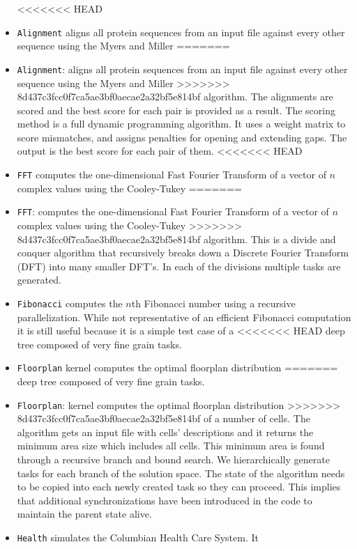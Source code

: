 \documentclass[sigconf]{acmart}
\begin{document}
\begin{itemize}
<<<<<<< HEAD
\item \texttt{Alignment} aligns all protein sequences from  an  input
file  against  every  other  sequence  using  the Myers and Miller 
=======
\item \texttt{Alignment}: aligns all protein sequences from  an  input
file  against  every  other  sequence  using  the Myers and Miller
>>>>>>> 8d437c3fcc0f7ca5ae3bf0aecae2a32bf5e814bf
algorithm. The alignments are scored and the best score for each pair is
provided as a result. The scoring method is  a  full  dynamic  programming
algorithm. It uses  a  weight matrix to score mismatches, and assigns
penalties for opening and extending gaps. The output is the best score for each
pair of them.
<<<<<<< HEAD
\item \texttt{FFT} computes the one-dimensional Fast Fourier Transform
of a vector of $n$ complex values using the Cooley-Tukey 
=======
\item \texttt{FFT}: computes the one-dimensional Fast Fourier Transform
of a vector of $n$ complex values using the Cooley-Tukey
>>>>>>> 8d437c3fcc0f7ca5ae3bf0aecae2a32bf5e814bf
algorithm. This is a divide and conquer algorithm that  recursively  breaks
down a Discrete Fourier Transform (DFT) into many smaller DFT’s. In each of the
divisions multiple tasks are generated.
\item \texttt{Fibonacci} computes the $n$th Fibonacci number using a  recursive
parallelization. While  not  representative  of  an efficient  Fibonacci
computation  it  is  still  useful  because  it  is a simple test case of a
<<<<<<< HEAD
deep tree composed of very fine grain tasks.  
\item \texttt{Floorplan} kernel computes the optimal floorplan distribution
=======
deep tree composed of very fine grain tasks.
\item \texttt{Floorplan}: kernel computes the optimal floorplan distribution
>>>>>>> 8d437c3fcc0f7ca5ae3bf0aecae2a32bf5e814bf
of a number of cells. The algorithm gets an input file with  cells'
descriptions  and  it  returns  the  minimum  area  size which includes all
cells. This minimum area is found through a recursive branch and bound search.
We hierarchically generate tasks  for  each  branch  of  the  solution  space.
The  state  of  the algorithm needs to be copied into each newly created task
so they can proceed. This implies that additional synchronizations have been
introduced in the code to maintain the parent state alive.
\item \texttt{Health} simulates the Columbian Health Care System. It

\end{itemize}
\end{document}

